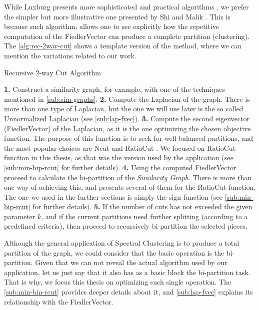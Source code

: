 While Luxburg presents more sophisticated and practical algorithms 
\cite{luxburg07}, we prefer the simpler but more illustrative one
presented by Shi and Malik \cite{shi00}. This is because such
algorithm, allows one to see explicitly how the repetitive computation
of the \gls{FiedlerVector} can produce a complete partition
(clustering). The \cref{alg:rec-2way-cut} shows a template version
of the method, where we can mention the variations related to our work.

\begin{algorithm}
  \label{alg:rec-2way-cut}
  \caption{Recursive 2-way Cut Algorithm}
  \DontPrintSemicolon
  \BlankLine
  \BlankLine
  \textbf{1.} Construct a similarity graph, for example, with one of the
  techniques mentioned in \cref{sub:sim-graphs}.
  \BlankLine
  \BlankLine
  \textbf{2.} Compute the \gls{Laplacian} of the graph. There is more than one
  type of Laplacian, but the one we will use later is the so called
  Unnormalized \gls{Laplacian} (see \cref{sub:lap-fvec}). 
  \BlankLine
  \BlankLine
  \textbf{3.} Compute the second eigenvector (\gls{FiedlerVector}) of the
  \gls{Laplacian}, as it is the one optimizing the chosen
  objective function. The purpose of this function is to seek for well
  balanced partitions, and the most popular choices are Ncut
  \cite{shi00} and RatioCut \cite{hagen92}. We focused on
  RatioCut function in this thesis, as that was the version used by the
  application (see \cref{sub:min-bip-rcut} for further details).
  \BlankLine
  \BlankLine
  \textbf{4.} Using the computed \gls{FiedlerVector} proceed to calculate the
  bi-partition of the \emph{Similarity Graph}. There is more than one
  way of achieving this, and \cite{hagen92} presents several of them
  for the RatioCut function. The one we used in the further sections
  is simply the sign function (see \cref{sub:min-bip-rcut} for further details).
  \BlankLine
  \BlankLine
  \textbf{5.} If the number of cuts has not exceeded the given parameter $k$, and
  if the current partitions need further splitting (according to a
  predefined criteria), then proceed to recursively bi-partition
  the selected pieces.
  \BlankLine
  \BlankLine    
\end{algorithm}
\hfill

Although the general application of Spectral Clustering is to produce
a total partition of the graph, we could consider that the basic
operation is the bi-partition. Given that we can not reveal the actual
algorithm used by our application, let us just say that it also has as a
basic block the bi-partition task. That is why, we focus this
thesis on optimizing such single operation. The
\cref{sub:min-bip-rcut} provides deeper details about it, and
\cref{sub:lap-fvec} explains its relationship with the \gls{FiedlerVector}. 

